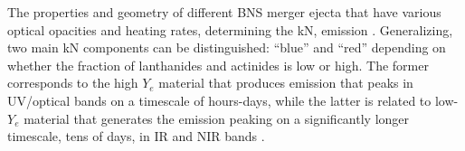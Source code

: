 %
%
%
%
%
%
%




%
The properties and geometry of different \ac{BNS} merger ejecta 
that have various optical opacities and heating rates, determining the \ac{kN}, 
emission \citep{Metzger:2019zeh}.
%
Generalizing, two main \ac{kN} components can be distinguished: 
``blue'' and ``red'' depending on whether the fraction of 
lanthanides and actinides is low or high.
%
The former corresponds to the high $Y_e$ material that produces emission 
that peaks in \ac{UV}/optical bands on a timescale of hours-days, 
while the latter is related to low-$Y_e$ material that generates the 
emission peaking on a significantly 
longer timescale, tens of days, in \ac{IR} and \ac{NIR} bands
\citep{Barnes:2013wka,Grossman:2013lqa,Lippuner:2015gwa}.

